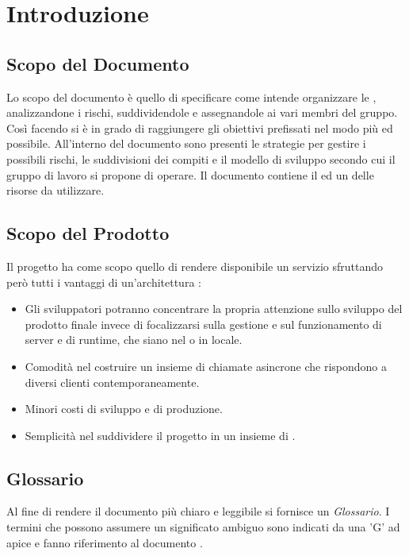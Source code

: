 \section{Introduzione}
\label{introduzione}
\subsection{Scopo del Documento}
Lo scopo del documento è quello di specificare come {\Gruppo} intende organizzare le , analizzandone i rischi, suddividendole e assegnandole ai vari membri del gruppo. Così facendo si è in grado di raggiungere gli obiettivi prefissati nel modo più  ed  possibile. All'interno del documento sono presenti le strategie per gestire i possibili rischi, le suddivisioni dei compiti e il modello di sviluppo secondo cui il gruppo di lavoro si propone di operare. Il documento contiene il  ed un  delle risorse da utilizzare.

\subsection{Scopo del Prodotto}
Il progetto {\NomeProgetto} ha come scopo quello di rendere disponibile un servizio  sfruttando però tutti i vantaggi di un'architettura :
\begin{itemize}
    \item Gli sviluppatori potranno concentrare la propria attenzione sullo sviluppo del prodotto finale invece di focalizzarsi sulla gestione e sul funzionamento di server e di runtime, che siano nel  o in locale.
    \item Comodità nel costruire un insieme di chiamate asincrone che rispondono a diversi clienti contemporaneamente.
    \item Minori costi di sviluppo e di produzione.
    \item Semplicità nel suddividere il progetto in un insieme di .
\end{itemize}

\subsection{Glossario}
Al fine di rendere il documento più chiaro e leggibile si fornisce un \textit{Glossario}. I termini che possono assumere un significato ambiguo sono indicati da una 'G' ad apice e fanno riferimento al documento .

